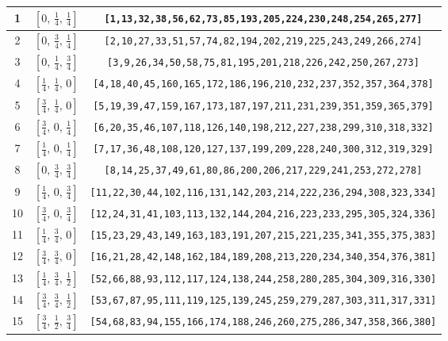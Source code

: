 \documentclass[fleqn,8pt]{jsarticle}
\begin{document}
\begin{longtable}{ccc}
1 & $\left[ 0,\, \frac{1}{4},\, \frac{1}{4} \right]$ & {\tt [1,13,32,38,56,62,73,85,193,205,224,230,248,254,265,277]} \\ \hline
2 & $\left[ 0,\, \frac{3}{4},\, \frac{1}{4} \right]$ & {\tt [2,10,27,33,51,57,74,82,194,202,219,225,243,249,266,274]} \\ \hline
3 & $\left[ 0,\, \frac{1}{4},\, \frac{3}{4} \right]$ & {\tt [3,9,26,34,50,58,75,81,195,201,218,226,242,250,267,273]} \\ \hline
4 & $\left[ \frac{1}{4},\, \frac{1}{4},\, 0 \right]$ & {\tt [4,18,40,45,160,165,172,186,196,210,232,237,352,357,364,378]} \\ \hline
5 & $\left[ \frac{3}{4},\, \frac{1}{4},\, 0 \right]$ & {\tt [5,19,39,47,159,167,173,187,197,211,231,239,351,359,365,379]} \\ \hline
6 & $\left[ \frac{3}{4},\, 0,\, \frac{1}{4} \right]$ & {\tt [6,20,35,46,107,118,126,140,198,212,227,238,299,310,318,332]} \\ \hline
7 & $\left[ \frac{1}{4},\, 0,\, \frac{1}{4} \right]$ & {\tt [7,17,36,48,108,120,127,137,199,209,228,240,300,312,319,329]} \\ \hline
8 & $\left[ 0,\, \frac{3}{4},\, \frac{3}{4} \right]$ & {\tt [8,14,25,37,49,61,80,86,200,206,217,229,241,253,272,278]} \\ \hline
9 & $\left[ \frac{1}{4},\, 0,\, \frac{3}{4} \right]$ & {\tt [11,22,30,44,102,116,131,142,203,214,222,236,294,308,323,334]} \\ \hline
10 & $\left[ \frac{3}{4},\, 0,\, \frac{3}{4} \right]$ & {\tt [12,24,31,41,103,113,132,144,204,216,223,233,295,305,324,336]} \\ \hline
11 & $\left[ \frac{1}{4},\, \frac{3}{4},\, 0 \right]$ & {\tt [15,23,29,43,149,163,183,191,207,215,221,235,341,355,375,383]} \\ \hline
12 & $\left[ \frac{3}{4},\, \frac{3}{4},\, 0 \right]$ & {\tt [16,21,28,42,148,162,184,189,208,213,220,234,340,354,376,381]} \\ \hline
13 & $\left[ \frac{1}{4},\, \frac{3}{4},\, \frac{1}{2} \right]$ & {\tt [52,66,88,93,112,117,124,138,244,258,280,285,304,309,316,330]} \\ \hline
14 & $\left[ \frac{3}{4},\, \frac{3}{4},\, \frac{1}{2} \right]$ & {\tt [53,67,87,95,111,119,125,139,245,259,279,287,303,311,317,331]} \\ \hline
15 & $\left[ \frac{3}{4},\, \frac{1}{2},\, \frac{3}{4} \right]$ & {\tt [54,68,83,94,155,166,174,188,246,260,275,286,347,358,366,380]} \\ \hline

\end{longtable}
\end{document}
